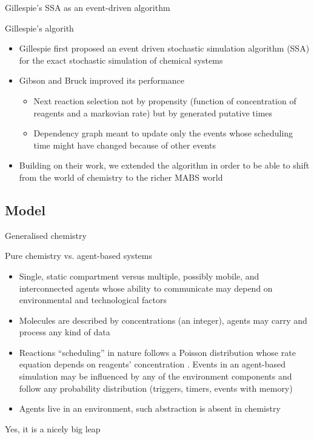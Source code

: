 \documentclass[presentation]{beamer} %
\begin{document}
\begin{frame}{Gillespie's SSA as an event-driven algorithm}
  \begin{block}{Gillespie's algorith}
    \begin{itemize}
      \item Gillespie \cite{gillespie1977} first proposed an event driven stochastic simulation algorithm (SSA) for the exact stochastic simulation of chemical systems
      \item Gibson and Bruck \cite{gibson2000} improved its performance
      \begin{itemize}
	\item Next reaction selection not by propensity (function of concentration of reagents and a markovian rate) but by generated putative times
	\item Dependency graph meant to update only the events whose scheduling time might have changed because of other events
      \end{itemize}
      \item Building on their work, we extended the algorithm in order to be able to shift from the world of chemistry to the richer MABS world
    \end{itemize}
  \end{block}
\end{frame}

\subsection{Model}
\begin{frame}{Generalised chemistry}
\begin{block}{Pure chemistry vs. agent-based systems}
\begin{itemize}
 \item Single, static compartment versus multiple, possibly mobile, and interconnected agents whose ability to communicate may depend on environmental and technological factors
 \item Molecules are described by concentrations (an integer), agents may carry and process any kind of data
 \item Reactions ``scheduling'' in nature follows a Poisson distribution whose rate equation depends on reagents' concentration \cite{gillespie1977}. Events in an agent-based simulation may be influenced by any of the environment components and follow any probability distribution (triggers, timers, events with memory)
 \item Agents live in an environment, such abstraction is absent in chemistry
\end{itemize}
\end{block}
Yes, it is a nicely big leap
\end{frame}
\end{document}
